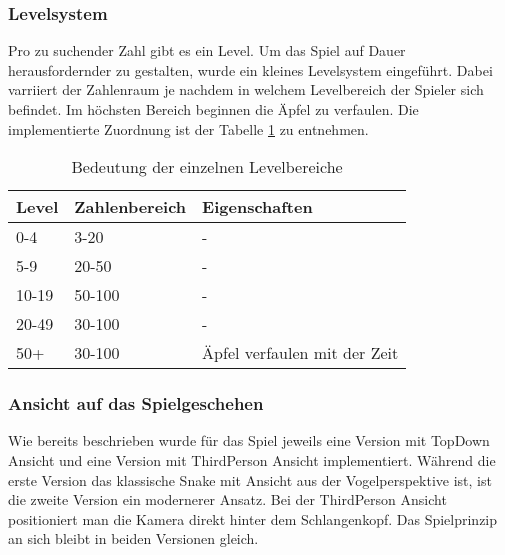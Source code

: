 \subsubsection{Levelsystem}
Pro zu suchender Zahl gibt es ein Level. Um das Spiel auf Dauer herausfordernder zu gestalten, wurde ein kleines Levelsystem eingeführt. Dabei varriiert der Zahlenraum je nachdem in welchem Levelbereich der Spieler sich befindet. Im höchsten Bereich beginnen die Äpfel zu verfaulen. Die implementierte Zuordnung ist der Tabelle \ref{tab:levels} zu entnehmen.
\begin{table}[h!]
\centering
\begin{tabular}{|l|l|l|}
\hline
\textbf{Level} & \textbf{Zahlenbereich} & \textbf{Eigenschaften}       \\ \hline
0-4            & 3-20                   & -                            \\ \hline
5-9            & 20-50                  & -                            \\ \hline
10-19          & 50-100                 & -                            \\ \hline
20-49          & 30-100                 & -                            \\ \hline
50+            & 30-100                 & Äpfel verfaulen mit der Zeit \\ \hline
\end{tabular}
\caption{Bedeutung der einzelnen Levelbereiche\label{tab:levels}}
\end{table}

\subsubsection{Ansicht auf das Spielgeschehen}
Wie bereits beschrieben wurde für das Spiel jeweils eine Version mit TopDown Ansicht und eine Version mit ThirdPerson Ansicht implementiert. Während die erste Version das klassische Snake mit Ansicht aus der Vogelperspektive ist, ist die zweite Version ein modernerer Ansatz. Bei der ThirdPerson Ansicht positioniert man die Kamera direkt hinter dem Schlangenkopf. Das Spielprinzip an sich bleibt in beiden Versionen gleich.


